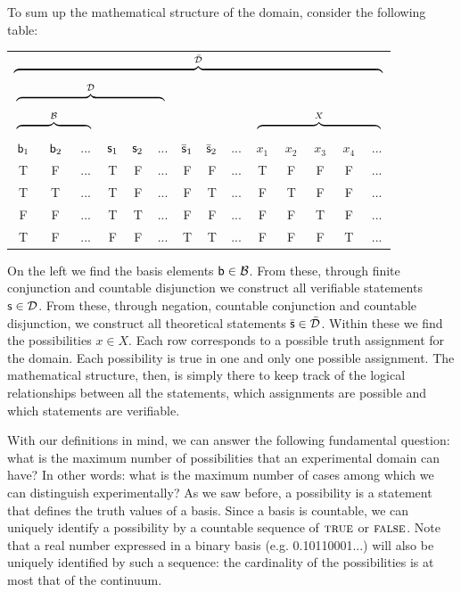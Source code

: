 \documentclass[11pt,letterpaper,fleqn]{memoir} %
\begin{document}
To sum up the mathematical structure of the domain, consider the following table:
\begin{center}
	\begin{tabular}{c|c|c|c|c|c|c|c|c|c|c|c|c|c}
		\multicolumn{14}{c}{$\overbrace{\rule{10.4cm}{0pt}}^{\tdomain}$} \\		\multicolumn{6}{c|}{$\overbrace{\rule{4.2cm}{0pt}}^{\edomain}$} & \multicolumn{6}{c}{}  \\		\multicolumn{3}{c|}{$\overbrace{\rule{2.1cm}{0pt}}^{\basis}$} & \multicolumn{3}{c|}{} & \multicolumn{3}{c|}{} & \multicolumn{5}{c}{$\overbrace{\rule{3.5cm}{0pt}}^{X}$} \\
		$\stmt[b]_1$ & $\stmt[b]_2$ & ... & $\stmt_1$ & $\stmt_2$ & ... & $\bar{\stmt}_1$ & $\bar{\stmt}_2$ & ... & $x_1$ & $x_2$ & $x_3$ &$x_4$ & ... \\
		\hline
		T & F & ... & T & F & ... & F & F & ... & T & F & F & F & ... \\
		T & T & ... & T & F & ... & F & T & ... & F & T & F & F & ... \\
		F & F & ... & T & T & ... & F & F & ... & F & F & T & F & ... \\
		T & F & ... & F & F & ... & T & T & ... & F & F & F & T & ... \\
	\end{tabular}
\end{center}
On the left we find the basis elements $\stmt[b] \in \basis$. From these, through finite conjunction and countable disjunction we construct all verifiable statements $\stmt \in \edomain$. From these, through negation, countable conjunction and countable disjunction, we construct all theoretical statements $\bar{\stmt} \in \tdomain$. Within these we find the possibilities $x \in X$. Each row corresponds to a possible truth assignment for the domain. Each possibility is true in one and only one possible assignment. The mathematical structure, then, is simply there to keep track of the logical relationships between all the statements, which assignments are possible and which statements are verifiable.

With our definitions in mind, we can answer the following fundamental question: what is the maximum number of possibilities that an experimental domain can have? In other words: what is the maximum number of cases among which we can distinguish experimentally? As we saw before, a possibility is a statement that defines the truth values of a basis. Since a basis is countable, we can uniquely identify a possibility by a countable sequence of $\TRUE$ or $\FALSE$. Note that a real number expressed in a binary basis (e.g. 0.10110001...) will also be uniquely identified by such a sequence: the cardinality of the possibilities is at most that of the continuum.
\end{document}
